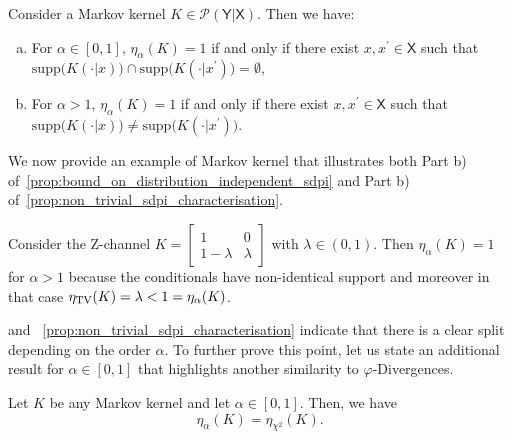 \documentclass[conference,letterpaper]{IEEEtran}
\def \X{\mathsf X}
\def \Y{\mathsf Y}
\def \calP{\mathcal P}
\def \supp {\mathrm{supp}}
\begin{document}
\begin{theorem}\label{prop:non_trivial_sdpi_characterisation}
    Consider a Markov kernel $K\in\calP(\Y|\X)$. Then we have:
    \begin{enumerate}[a)]
        \item For $\alpha\in[0,1]$, $\eta_\alpha(K)=1$ if and only if there exist  $x, x^\prime\in\X$ such that ${\supp\big(K(\cdot|x)\big)\cap\supp\big(K(\cdot|x^\prime)\big)=\emptyset}$,
        \item For $\alpha>1$, $\eta_\alpha(K)=1$ if and only if there exist  ${x, x^\prime\in\X}$ such that ${\supp\big(K(\cdot|x)\big)\neq\supp\big(K(\cdot|x^\prime)\big)}$.
    \end{enumerate}
\end{theorem}
We now provide an example of Markov kernel that illustrates both Part b) of~\cref{prop:bound_on_distribution_independent_sdpi} and Part b) of~\cref{prop:non_trivial_sdpi_characterisation}.
\begin{example}
    Consider the Z-channel $K = \begin{bmatrix}
        1 & 0\\
        1-\lambda & \lambda
    \end{bmatrix}$ with $\lambda\in(0,1)$. Then $\eta_\alpha(K)=1$ for $\alpha>1$ because the conditionals have non-identical support and moreover in that case ${\eta_{\rm TV}(K)=\lambda<1=\eta_\alpha(K)}$.
\end{example}
 and ~\cref{prop:non_trivial_sdpi_characterisation} indicate that there is a clear split depending on the order $\alpha$. To further prove this point, let us state an additional result for $\alpha\in[0,1]$ that highlights another similarity to $\varphi$-Divergences.
\begin{theorem}\label{prop:distribution_independent_sdpi_equal_chi_square_sdpi}
    Let $K$ be any Markov kernel and let $\alpha\in[0,1]$. Then, we have
    \begin{equation*}
        \eta_\alpha(K) = \eta_{\chi^2}(K).
    \end{equation*}
\end{theorem}
\end{document}

